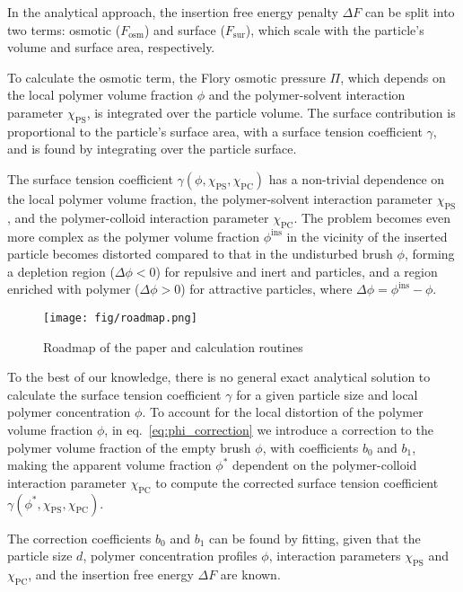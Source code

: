 \documentclass[10pt, a4paper]{article}
\begin{document}
\begin{multicols}{2}
In the analytical approach, the insertion free energy penalty $\Delta F$ can be split into two terms: osmotic ($F_{\textrm{osm}}$) and surface ($F_{\textrm{sur}}$), which scale with the particle's volume and surface area, respectively.

To calculate the osmotic term, the Flory osmotic pressure $\Pi$, which depends on the local polymer volume fraction $\phi$ and the polymer-solvent interaction parameter $\chi_{\textrm{PS}}$, is integrated over the particle volume.
The surface contribution is proportional to the particle's surface area, with a surface tension coefficient $\gamma$, and is found by integrating over the particle surface.

The surface tension coefficient $\gamma(\phi, \chi_{\textrm{PS}}, \chi_{\textrm{PC}})$ has a non-trivial dependence on the local polymer volume fraction, the polymer-solvent interaction parameter $\chi_{\textrm{PS}}$, and the polymer-colloid interaction parameter $\chi_{\textrm{PC}}$.
The problem becomes even more complex as the polymer volume fraction $\phi^{\textrm{ins}}$ in the vicinity of the inserted particle becomes distorted compared to that in the undisturbed brush $\phi$, forming a depletion region ($\Delta \phi < 0$) for repulsive and inert and particles, and a region enriched with polymer ($\Delta \phi > 0$) for attractive particles, where $\Delta \phi = \phi^{\textrm{ins}} - \phi$.

\begin{figure}[H]
    \centering
    \texttt{[image: fig/roadmap.png]}
    \caption{Roadmap of the paper and calculation routines}
    \label{fig:paper_roadmap}
\end{figure}

To the best of our knowledge, there is no general exact analytical solution to calculate the surface tension coefficient $\gamma$ for a given particle size and local polymer concentration $\phi$.
To account for the local distortion of the polymer volume fraction $\phi$, in eq.~\ref{eq:phi_correction} we introduce a correction to the polymer volume fraction of the empty brush $\phi$, with coefficients $b_0$ and $b_1$, making the apparent volume fraction $\phi^{\ast}$ dependent on the polymer-colloid interaction parameter $\chi_{\textrm{PC}}$ to compute the corrected surface tension coefficient $\gamma(\phi^{\ast}, \chi_{\textrm{PS}}, \chi_{\textrm{PC}})$.

The correction coefficients $b_0$ and $b_1$ can be found by fitting, given that the particle size $d$, polymer concentration profiles $\phi$, interaction parameters $\chi_{\textrm{PS}}$ and $\chi_{\textrm{PC}}$, and the insertion free energy $\Delta F$ are known.


\end{multicols}
\end{document}
